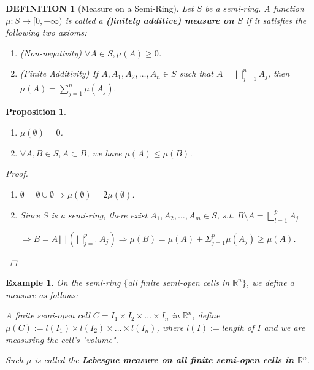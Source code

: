 \documentclass[12pt]{article}
\theoremstyle{blueplain}
\newtheorem{proposition}[theorem]{Proposition}
\theoremstyle{bluedef}
\newtheorem{definition}{DEFINITION}[section]
\theoremstyle{blueremark}
\newtheorem{example}{Example}[section]
\newcommand{\R}{\mathbb{R}}
\numberwithin{equation}{section}
\begin{document}
\begin{definition}[Measure on a Semi-Ring]

  Let $S$ be a semi-ring. A function $\mu: S \rightarrow [0, + \infty)$ is called a \textbf{(finitely additive) measure on $S$} if it satisfies the following two axioms:
  \begin{enumerate}
    \item (Non-negativity) $\forall A \in S, \mu(A) \geq 0$.
    \item (Finite Additivity) If $A, A_1, A_2, \ldots, A_n \in S$ such that $A = \bigsqcup_{j=1}^n A_j$, then
          \(\mu(A) = \sum_{j=1}^n \mu(A_j).\)
  \end{enumerate}
\end{definition}

\begin{proposition}
  \begin{enumerate}
    \item $\mu(\emptyset) = 0$.
    \item $\forall A, B \in S, A \subset B$, we have $\mu(A) \leq \mu(B)$.
  \end{enumerate}
  \begin{proof}
    \begin{enumerate}
      \item $\emptyset = \emptyset \cup \emptyset \Rightarrow \mu(\emptyset) = 2\mu(\emptyset)$.
      \item Since $S$ is a semi-ring, there exist $A_1, A_2, \ldots, A_m \in S$, s.t. $B \setminus A = \bigsqcup_{l=1}^p A_j$

            $\Rightarrow B = A \bigsqcup (\bigsqcup_{j=1}^p A_j) \Rightarrow \mu(B) = \mu(A) + \Sigma_{j=1}^p \mu(A_j) \geq \mu(A)$.
    \end{enumerate}
  \end{proof}
\end{proposition}

\begin{example}
  On the semi-ring $\{$all finite semi-open cells in $\R^n\}$, we define a measure as follows:

  A finite semi-open cell $C = I_1 \times I_2 \times \ldots \times I_n$ in $\R^n$, define $\mu(C) := l(I_1) \times l(I_2) \times \ldots \times l(I_n)$, where $l(I) := $length of $I$ and we are measuring the cell's "volume".

  Such $\mu$ is called the \textbf{Lebesgue measure on all finite semi-open cells in $\R^n$}.
\end{example}
\end{document}
